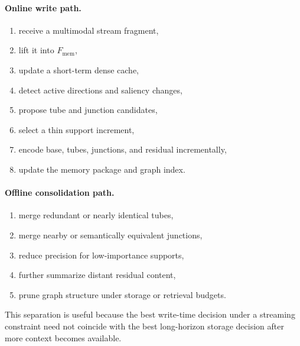 \documentclass[11pt]{article}
\begin{document}
\paragraph{Online write path.}
\begin{enumerate}[leftmargin=1.5em]
\item receive a multimodal stream fragment,
\item lift it into $F_{\mathrm{mem}}$,
\item update a short-term dense cache,
\item detect active directions and saliency changes,
\item propose tube and junction candidates,
\item select a thin support increment,
\item encode base, tubes, junctions, and residual incrementally,
\item update the memory package and graph index.
\end{enumerate}

\paragraph{Offline consolidation path.}
\begin{enumerate}[leftmargin=1.5em]
\item merge redundant or nearly identical tubes,
\item merge nearby or semantically equivalent junctions,
\item reduce precision for low-importance supports,
\item further summarize distant residual content,
\item prune graph structure under storage or retrieval budgets.
\end{enumerate}
This separation is useful because the best write-time decision under a streaming constraint need not coincide with the best long-horizon storage decision after more context becomes available.
\end{document}
